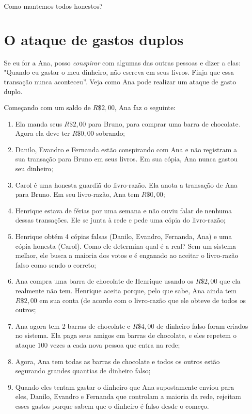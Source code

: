 Como mantemos todos honestos?

\section*{O ataque de gastos duplos}

Se eu for a Ana, posso \textit{conspirar} com algumas das outras pessoas e dizer a elas: "Quando eu gastar o meu dinheiro, não escreva em seus livros. Finja que essa transação nunca aconteceu”. Veja como Ana pode realizar um ataque de gasto duplo.

Começando com um saldo de $R\$2,00$, Ana faz o seguinte:

\begin{enumerate}
\item Ela manda seus $R\$2,00$ para Bruno, para comprar uma barra de chocolate. Agora ela deve ter $R\$0,00$ sobrando;
\item Danilo, Evandro e Fernanda estão conspirando com Ana e não registram a sua transação para Bruno em seus livros. Em sua cópia, Ana nunca gastou seu dinheiro;
\item Carol é uma honesta guardiã do livro-razão. Ela anota a transação de Ana para Bruno. Em seu livro-razão, Ana tem $R\$0,00$;
\item Henrique estava de férias por uma semana e não ouviu falar de nenhuma dessas transações. Ele se junta à rede e pede uma cópia do livro-razão;
\item Henrique obtém 4 cópias falsas (Danilo, Evandro, Fernanda, Ana) e uma cópia honesta (Carol). Como ele determina qual é a real? Sem um sistema melhor, ele busca a maioria dos votos e é enganado ao aceitar o livro-razão falso como sendo o correto;
\item Ana compra uma barra de chocolate de Henrique usando os $R\$2,00$ que ela realmente não tem. Henrique aceita porque, pelo que sabe, Ana ainda tem $R\$2,00$ em sua conta (de acordo com o livro-razão que ele obteve de todos os outros;
\item Ana agora tem 2 barras de chocolate e $R\$4,00$ de dinheiro falso foram criados no sistema. Ela paga seus amigos em barras de chocolate, e eles repetem o ataque 100 vezes a cada nova pessoa que entra na rede;
\item Agora, Ana tem todas as barras de chocolate e todos os outros estão segurando grandes quantias de dinheiro falso;
\item Quando eles tentam gastar o dinheiro que Ana supostamente enviou para eles, Danilo, Evandro e Fernanda que controlam a maioria da rede, rejeitam esses gastos porque sabem que o dinheiro é falso desde o começo.
\end{enumerate}

